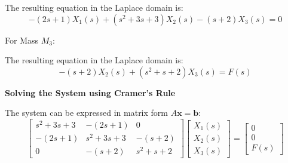 ﻿\documentclass[11pt]{article}
\begin{document}
The resulting equation in the Laplace domain is:
\begin{equation}
-(2s + 1)X_1(s) + (s^2 + 3s + 3)X_2(s) - (s + 2)X_3(s) = 0 \tag{2}
\end{equation}

\newpage

\vspace{12pt}
{For Mass $M_3$:}
\begin{figure}[h!]
\centering
{}
\end{figure}

The resulting equation in the Laplace domain is:
\begin{equation}
-(s + 2)X_2(s) + (s^2 + s + 2)X_3(s) = F(s) \tag{3}
\end{equation}

\noindent\textbf{Solving the System using Cramer's Rule}
\vspace{12pt}

The system can be expressed in matrix form $A\mathbf{x} = \mathbf{b}$:
$$
\begin{bmatrix}
s^2 + 3s + 3 & -(2s + 1) & 0 \\
-(2s + 1) & s^2 + 3s + 3 & -(s + 2) \\
0 & -(s + 2) & s^2 + s + 2
\end{bmatrix}
\begin{bmatrix}
X_1(s) \\
X_2(s) \\
X_3(s)
\end{bmatrix}
=
\begin{bmatrix}
0 \\
0 \\
F(s)
\end{bmatrix}
$$
\end{document}
